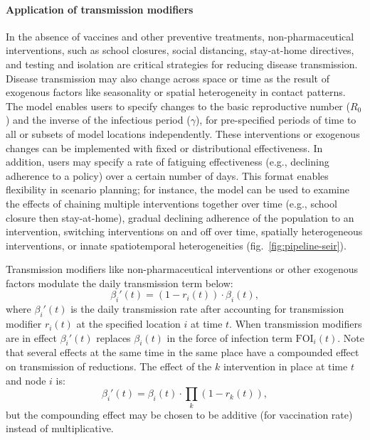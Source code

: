 {\paragraph{Application of transmission modifiers}
In the absence of vaccines and other preventive treatments, non-pharmaceutical interventions, such as school closures, social distancing, stay-at-home directives, and testing and isolation are critical strategies for reducing disease transmission. Disease transmission may also change across space or time as the result of exogenous factors like seasonality or spatial heterogeneity in contact patterns. The model enables users to specify changes to the basic reproductive number ($R_0$) and the inverse of the infectious period ($\gamma$), for pre-specified periods of time to all or subsets of model locations independently. These interventions or exogenous changes can be implemented with fixed or distributional effectiveness. In addition, users may specify a rate of fatiguing effectiveness (e.g., declining adherence to a policy) over a certain number of days. This format enables flexibility in scenario planning; for instance, the model can be used to examine the effects of chaining multiple interventions together over time (e.g., school closure then stay-at-home), gradual declining adherence of the population to an intervention, switching interventions on and off over time, spatially heterogeneous interventions, or innate spatiotemporal heterogeneities (fig.~\ref{fig:pipeline-seir}).

Transmission modifiers like non-pharmaceutical interventions or other exogenous factors modulate the daily transmission term below:
\begin{equation}
\beta _i'(t)=\left(1-r_i(t)\right)\cdot \beta_i (t),
\end{equation}
where $\beta_i'(t)$ is the daily transmission rate after accounting for transmission modifier $r_i(t)$ at the specified location $i$ at time $t$. When transmission modifiers are in effect $\beta_i'(t)$ replaces $\beta_i(t)$ in the force of infection term $\text{FOI}_i(t)$.
Note that several effects at the same time in the same place have a compounded effect on transmission of reductions. The effect of the $k$ intervention in place at time $t$ and node $i$ is:
\begin{equation}
	\beta_i'(t) =  \beta_i(t) \cdot  \prod_k \left(1-r_k(t) \right), \label{eq:npi_comp}
\end{equation}
but the compounding effect may be chosen to be additive (\eg for vaccination rate) instead of multiplicative.

}
